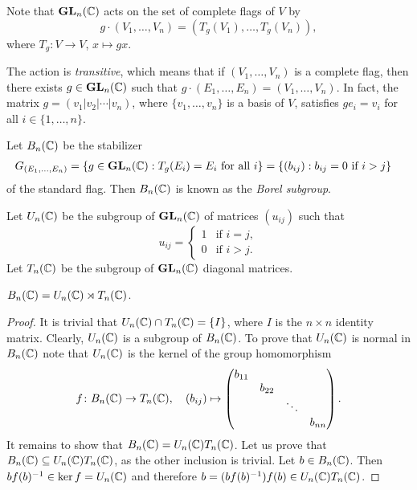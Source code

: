 Note that $\mathbf{GL}_n(\mathbb{C})$ acts on the set of complete flags of $V$ 
by 
\[
g\cdot (V_1,\dots,V_n)=(T_g(V_1),\dots,T_g(V_n)),
\]
where $T_g\colon V\to V$, $x\mapsto gx$. 

The action is \emph{transitive}, 
which means that if $(V_1,\dots,V_n)$ 
is a complete flag, then there exists 
$g\in\mathbf{GL}_n(\mathbb{C})$ such that $g\cdot (E_1,\dots,E_n)=(V_1,\dots,V_n)$. 
In fact, 
the matrix $g=(v_1|v_2|\cdots|v_n)$, where
$\{v_1,\dots,v_n\}$ is a basis of $V$, 
satisfies $ge_i=v_i$ for all $i\in\{1,\dots,n\}$. 

\label{Borel subgroup}
Let $B_n(\mathbb{C})$ be the stabilizer    
\begin{align*}
G_{(E_1,\dots,E_n)}
&=\{g\in\mathbf{GL}_n(\mathbb{C}):T_g(E_i)=E_i\text{ for all $i$}\}
=\{(b_{ij}):b_{ij}=0\text{ if $i>j$}\}
\end{align*}
of the standard flag. Then $B_n(\mathbb{C})$ is 
known as the \emph{Borel subgroup}. 

Let $U_n(\mathbb{C})$ be the subgroup of $\mathbf{GL}_n(\mathbb{C})$ 
of matrices $(u_{ij})$ such that 
\[
u_{ij}=\begin{cases}
1&\text{if $i=j$},\\
0&\text{if $i>j$}.\end{cases}
\]
Let $T_n(\mathbb{C})$ be the subgroup of $\mathbf{GL}_n(\mathbb{C})$ diagonal matrices. 

\begin{proposition}
    $B_n(\mathbb{C})=U_n(\mathbb{C})\rtimes T_n(\mathbb{C})$. 
\end{proposition}

\begin{proof}
    It is trivial that $U_n(\mathbb{C})\cap T_n(\mathbb{C})=\{I\}$, where $I$ is the 
    $n\times n$ identity matrix. Clearly, $U_n(\mathbb{C})$ is a subgroup of $B_n(\mathbb{C})$.
    To prove that 
    $U_n(\mathbb{C})$ is normal in $B_n(\mathbb{C})$ note that $U_n(\mathbb{C})$ is the kernel
    of the group homomorphism
    \[
    f\colon B_n(\mathbb{C})\to T_n(\mathbb{C}),\quad
    (b_{ij})\mapsto\begin{pmatrix}
        b_{11}\\
        &b_{22}\\
        &&\ddots\\
        &&&b_{nn}
    \end{pmatrix}.
    \]
    It remains to show that $B_n(\mathbb{C})=U_n(\mathbb{C})T_n(\mathbb{C})$.
    Let us prove that  $B_n(\mathbb{C})\subseteq U_n(\mathbb{C})T_n(\mathbb{C})$, as the other inclusion is trivial. 
    Let $b\in B_n(\mathbb{C})$. Then
    $bf(b)^{-1}\in \ker f=U_n(\mathbb{C})$ and therefore  
    $b=(bf(b)^{-1})f(b)\in U_n(\mathbb{C})T_n(\mathbb{C})$. 
\end{proof}

